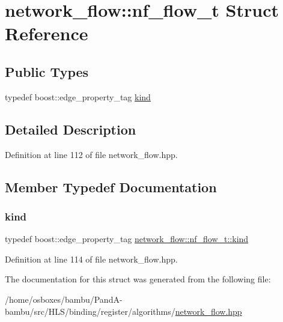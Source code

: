 \hypertarget{structnetwork__flow_1_1nf__flow__t}{}\section{network\+\_\+flow\+:\+:nf\+\_\+flow\+\_\+t Struct Reference}
\label{structnetwork__flow_1_1nf__flow__t}
\subsection*{Public Types}
\begin{DoxyCompactItemize}
\item 
typedef boost\+::edge\+\_\+property\+\_\+tag \hyperlink{structnetwork__flow_1_1nf__flow__t_adc9b27f76e4491409ee3621b2a90a454}{kind}
\end{DoxyCompactItemize}


\subsection{Detailed Description}


Definition at line 112 of file network\+\_\+flow.\+hpp.



\subsection{Member Typedef Documentation}
\mbox{\label{structnetwork__flow_1_1nf__flow__t_adc9b27f76e4491409ee3621b2a90a454}} 
\subsubsection{\texorpdfstring{kind}{kind}}
{\footnotesize\ttfamily typedef boost\+::edge\+\_\+property\+\_\+tag \hyperlink{structnetwork__flow_1_1nf__flow__t_adc9b27f76e4491409ee3621b2a90a454}{network\+\_\+flow\+::nf\+\_\+flow\+\_\+t\+::kind}}



Definition at line 114 of file network\+\_\+flow.\+hpp.



The documentation for this struct was generated from the following file\+:\begin{DoxyCompactItemize}
\item 
/home/osboxes/bambu/\+Pand\+A-\/bambu/src/\+H\+L\+S/binding/register/algorithms/\hyperlink{network__flow_8hpp}{network\+\_\+flow.\+hpp}\end{DoxyCompactItemize}
